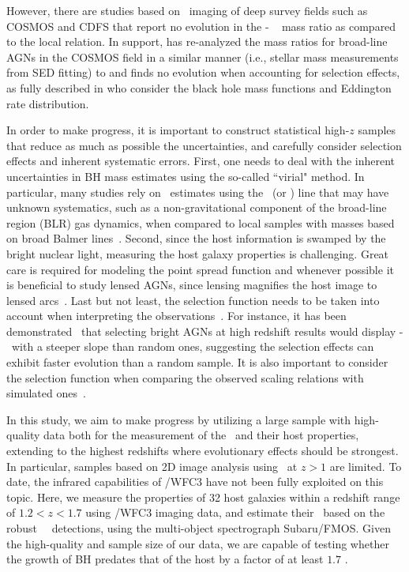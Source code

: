\documentclass[apj]{emulateapj}
\begin{document}
However, there are studies \citep{Cisternas2011,SS13,Mechtley2016} based on \hst\  imaging of deep survey fields such as COSMOS and CDFS that report no evolution in the \mbh - \smass ~ mass ratio as compared to the local relation. In support, \citet{Sun2015} has re-analyzed the mass ratios for broad-line AGNs in the COSMOS field in a similar manner (i.e., stellar mass measurements from SED fitting) to \citet{Merloni2010} and finds no evolution when accounting for selection effects, as fully described in \citet{Schulze2014} who consider the black hole mass functions and Eddington rate distribution. 

In order to make progress, it is important to construct statistical high-$z$ samples that reduce as much as possible the uncertainties, and carefully consider selection effects and inherent systematic errors. First, one needs to deal with the inherent uncertainties in BH mass estimates using the so-called ``virial" method. In particular, many studies rely on \mbh\ estimates using the \Civ\ (or \Mgii) line that may have unknown systematics, such as a non-gravitational component of the broad-line region (BLR) gas dynamics, when compared to local samples with masses based on broad Balmer lines~\citep[i.e., \halpha\ and \hbeta,][]{Schulze2018, Baskin2005, Trakhtenbrot2012}. Second, since the host information is swamped by the bright nuclear light, measuring the host galaxy properties is challenging. Great care is required for modeling the point spread function and whenever possible it is beneficial to study lensed AGNs, since lensing magnifies the host image to lensed arcs~\citep{Pen++06qsob, Ding2017a, Ding2017b}. Last but not least, the selection function needs to be taken into account when interpreting the observations~\citep{Treu2007, Lauer2007}. For instance, it has been demonstrated~\citep{Schulze2011, Schulze2014} that selecting bright AGNs at high redshift results would display \mbh - \smass\ with a steeper slope than random ones, suggesting the selection effects can exhibit faster evolution than a random sample. It is also important to consider the selection function when comparing the observed scaling relations with simulated ones~\citep{DeG++15}.

In this study, we aim to make progress by utilizing a large sample with high-quality data both for the measurement of the \mbh\ and their host properties, extending to the highest redshifts where evolutionary effects should be strongest. In particular, samples based on 2D image analysis using \hst\ at $z>1$ are limited. To date, the infrared capabilities of \hst/WFC3 have not been fully exploited on this topic. Here, we measure the properties of 32 host galaxies within a redshift range of $1.2<z<1.7$ using \hst/WFC3 imaging data, and estimate their \mbh\ based on the robust \halpha\ ~detections, using the multi-object spectrograph Subaru/FMOS. Given the high-quality and sample size of our data, we are capable of testing whether the growth of BH predates that of the host by a factor of at least $1.7$ \citep[i.e., $\sim0.23$ dex,][]{Schulze2014}.
\end{document}
